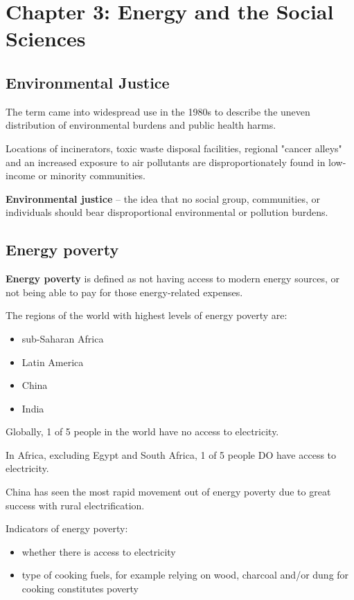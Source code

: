 \section{Chapter 3: Energy and the Social Sciences}

\subsection{Environmental Justice}

The term came into widespread use in the 1980s to describe the uneven
distribution of environmental burdens and public health harms.

Locations of incinerators, toxic waste disposal facilities, regional "cancer
alleys" and an increased exposure to air pollutants are disproportionately
found in low-income or minority communities.

\textbf{Environmental justice} -- the idea that no social group, communities,
or individuals should bear disproportional environmental or pollution burdens.

\subsection{Energy poverty}

\textbf{Energy poverty} is defined as not having access to modern energy
sources, or not being able to pay for those energy-related expenses.

The regions of the world with highest levels of energy poverty are:
\begin{itemize}
	\item sub-Saharan Africa
	\item Latin America
	\item China
	\item India
\end{itemize}

Globally, 1 of 5 people in the world have no access to electricity.

In Africa, excluding Egypt and South Africa, 1 of 5 people DO have access to
electricity.

China has seen the most rapid movement out of energy poverty due to great
success with rural electrification.

Indicators of energy poverty:
\begin{itemize}
	\item whether there is access to electricity
	\item type of cooking fuels, for example relying on wood, charcoal
	and/or dung for cooking constitutes poverty
\end{itemize}

